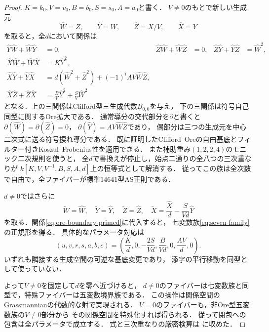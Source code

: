 \begin{proof}
$K=k_0,V=v_0,B=b_0,S=s_0,A=a_0$と書く．
$V\ne0$のもとで新しい生成元
\[
 \widehat W=Z,\qquad \widehat Y=W,\qquad
 \widehat Z=X/V,\qquad\widehat X=Y
\]
を取ると，全$d$において関係は
\begin{equation}\label{eq:ore-boundary-primed}
\begin{aligned}
 \widehat Y\widehat W+\widehat W\widehat Y&=0, &
 \widehat Z\widehat W+\widehat W\widehat Z&=0, &
 \widehat Z\widehat Y+\widehat Y\widehat Z&=\widehat W^2,\\
 \widehat X\widehat W+\widehat W\widehat X&=K\widehat Y^2,\\
 \widehat X\widehat Y+\widehat Y\widehat X
  &=d(\widehat W^2+\widehat Z^2)+(-1)^i AV\widehat W\widehat Z,\\
 \widehat X\widehat Z+\widehat Z\widehat X
  &=\frac BV\widehat Y^2+\frac SV\widehat W^2
\end{aligned}
\end{equation}
となる．上の三関係はClifford型三生成代数$B_{0,0}$を与え，
下の三関係は符号自己同型に関するOre拡大である．
通常導分の交代部分を$\partial$と書くと
$\partial(\widehat W)=\partial(\widehat Z)=0$，
$\partial(\widehat Y)=AV\widehat W\widehat Z$であり，
偶部分は三つの生成元を中心二次式に送る符号捩れ導分である．
既に証明したClifford--Oreの自由基底とフィルター付きKoszul--Frobenius性を適用できる．
また補助重み$(1,2,2,4)$のモニック二次規則を使うと，
全$d$で書換えが停止し，始点二通りの全八つの三次重なりが
$k[K,V,V^{-1},B,S,A,d]$上の恒等式として解消する．
従ってこの族は全次数で自由で，全ファイバーが標準14641型AS正則である．

$d\ne0$ではさらに
\[
 \widetilde W=\widehat W,\quad
 \widetilde Y=\widehat Y,\quad
 \widetilde Z=\widehat Z,\quad
 \widetilde X=\frac{\widehat X}{d}-\frac{S}{Vd}\widehat Y
\]
を取る．関係\eqref{eq:ore-boundary-primed}に代入すると，
七変数族\eqref{eq:seven-family}の正規形を得る．
具体的なパラメータ対応は
\begin{equation}\label{eq:boundary-to-seven}
 (u,v,r,s,a,b,c)
 =\left(\frac Kd,0,-\frac{2S}{Vd},
          \frac B{Vd},0,\frac{AV}{d},0\right).
\end{equation}
いずれも隣接する生成空間の可逆な基底変更であり，
添字の平行移動を同型として使っていない．

よって$V\ne0$を固定して$d$を零へ近づけると，
$d\ne0$のファイバーは七変数族と同型で，特殊ファイバーは五変数境界族である．
この操作は関係空間のGrassmannianの代数的な射で実現される．
$V=0$のファイバーも，非Ore型五変数族の$V\ne0$部分から
その関係空間を特殊化すれば得られる．
従って閉包への包含は全パラメータで成立する．
式と三次重なりの厳密検算は
に収めた．
\end{proof}


